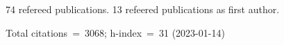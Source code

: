 74 refereed publications. 13 refeered publications as first author.

Total citations~=~3068; h-index~=~31 (2023-01-14)